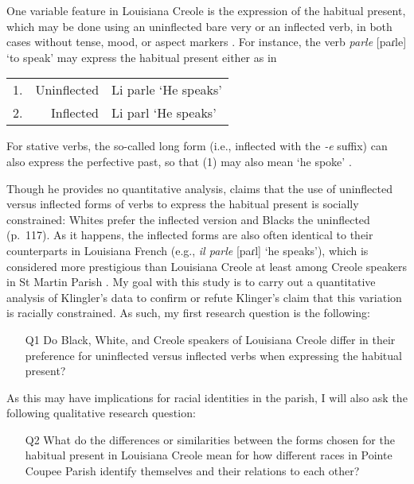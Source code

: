\documentclass{article}
\newcommand{\lexi}[1]{\textit{#1}}
\newcommand{\gloss}[1]{`#1'}
\begin{document}
    One variable feature in Louisiana Creole is the expression of the habitual present, which may be done using an uninflected bare very or an inflected verb, in both cases without tense, mood, or aspect markers \parencite[pp.~237]{klingler_if_2003}.
    For instance, the verb \lexi{parle} [paɾle] \gloss{to speak} may express the habitual present either as in

    \begin{tabular}{l r l}
      1. & Uninflected & Li parle \gloss{He speaks} \\
      2. & Inflected   & Li parl \gloss{He speaks}
    \end{tabular}

    For stative verbs, the so-called long form (i.e., inflected with the \emph{-e} suffix) can also express the perfective past, so that (1) may also mean \gloss{he spoke} \textcite[p.~252]{klingler_if_2003}.

    Though he provides no quantitative analysis, \textcite{klingler_if_2003} claims that the use of uninflected versus inflected forms of verbs to express the habitual present is socially constrained: Whites prefer the inflected version and Blacks the uninflected (p.~117).
    As it happens, the inflected forms are also often identical to their counterparts in Louisiana French (e.g., \lexi{il parle} [paɾl] \gloss{he speaks}), which is considered more prestigious than Louisiana Creole at least among Creole speakers in St Martin Parish \parencite[pp.~23-25]{neumann_creole_1985}.
    My goal with this study is to carry out a quantitative analysis of Klingler's data to confirm or refute Klinger's claim that this variation is racially constrained.
    As such, my first research question is the following:
    \begin{enumerate}
      \item[Q1] Do Black, White, and Creole speakers of Louisiana Creole differ in their preference for uninflected versus inflected verbs when expressing the habitual present?
    \end{enumerate}
    As this may have implications for racial identities in the parish, I will also ask the following qualitative research question:
    \begin{enumerate}
      \item[Q2] What do the differences or similarities between the forms chosen for the habitual present in Louisiana Creole mean for how different races in Pointe Coupee Parish identify themselves and their relations to each other?
    \end{enumerate}
\end{document}
